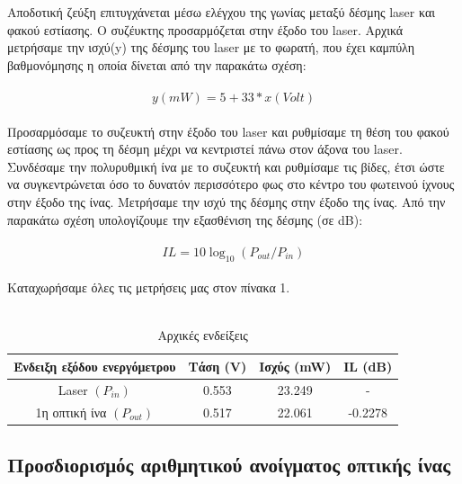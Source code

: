 \documentclass[a4paper,11pt,titlepage]{article}
\begin{document}
Αποδοτική ζεύξη επιτυγχάνεται μέσω ελέγχου της γωνίας μεταξύ δέσμης laser και φακού εστίασης. Ο συζέυκτης προσαρμόζεται στην έξοδο του laser. Aρχικά μετρήσαμε την ισχύ(y) της δέσμης του laser με το φωρατή, που έχει καμπύλη βαθμονόμησης η οποία δίνεται από την παρακάτω σχέση:
\\\\
\begin{equation}
y(mW) = 5 + 33*x(Volt)
\end{equation}
\\
Προσαρμόσαμε το συζευκτή στην έξοδο του laser και ρυθμίσαμε τη θέση του φακού εστίασης ως προς τη δέσμη μέχρι να κεντριστεί πάνω στον άξονα του laser. Συνδέσαμε την πολυρυθμική ίνα με το συζευκτή και ρυθμίσαμε τις βίδες, έτσι ώστε να συγκεντρώνεται όσο το δυνατόν περισσότερο φως στο κέντρο του φωτεινού ίχνους στην έξοδο της ίνας. Μετρήσαμε την ισχύ της δέσμης στην έξοδο της ίνας. Από την παρακάτω σχέση υπολογίζουμε την εξασθένιση της δέσμης (σε dB):
\\\\
\begin{equation}
IL=10 \log_{10} (P_{out}/P_{in})
\end{equation}
\\
Καταχωρήσαμε όλες τις μετρήσεις μας στον πίνακα 1. \\\\

\begin{table} [bph!]
\centering
\begin{tabular}{|c|c|c|c|}
\hline \rule[-2ex]{0pt}{5.5ex} Ένδειξη εξόδου ενεργόμετρου & Τάση (V) & Ισχύς (mW) & IL (dB) \\ 
\hline \rule[-2ex]{0pt}{5.5ex} Laser $(P_{in})$ & 0.553 & 23.249 & - \\
\hline \rule[-2ex]{0pt}{5.5ex} 1η οπτική ίνα $(P_{out})$ & 0.517 & 22.061 & -0.2278 \\ 
\hline 
\end{tabular} 
\caption{Αρχικές ενδείξεις}
\end{table} 

\newpage

\subsection{Προσδιορισμός αριθμητικού ανοίγματος οπτικής ίνας} %
\end{document}
